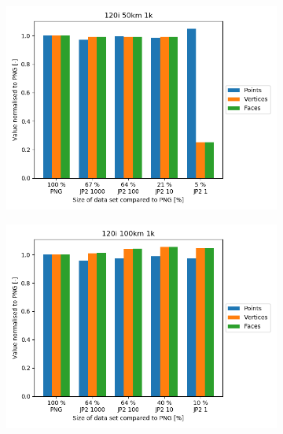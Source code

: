 \begin{figure}[htb]
    \centering
        \begin{subfigure}[b]{0.49\textwidth}
            \centering
            \includegraphics[width=\textwidth]{doc/thesis/0_figures/recon/120i_50km_1k.png}
            \caption{}
            \label{fig:recon_120_50_1}
        \end{subfigure}
        \begin{subfigure}[b]{0.49\textwidth}
            \centering
            \includegraphics[width=\textwidth]{doc/thesis/0_figures/recon/120i_100km_1k.png}
            \caption{}
            \label{fig:recon_120_100_1}
        \end{subfigure}
        \\

\end{figure}

